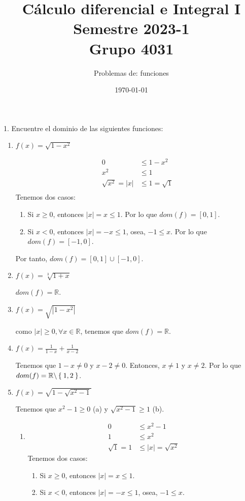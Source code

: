 \documentclass[11pt]{article}
\newcommand{\R}{\mathbb{R}}
\let\set\Set
\begin{document}
\title{\vspace{-2cm}Cálculo diferencial e Integral I \\ Semestre 2023-1 \\ Grupo 4031}
\author{Problemas de: funciones \\ }
\date{\today}
\maketitle
\thispagestyle{empty}

1. Encuentre el dominio de las siguientes funciones: \begin{enumerate}[label=\roman*)]
 \item $f(x)=\sqrt{1-x^2}$
 
 \begin{align*}
  0 &\leq 1-x^2 \\
  x^2 &\leq 1\\
  \sqrt{x^2} = |x| &\leq 1= \sqrt{1}\\
 \end{align*} Tenemos dos casos: \begin{enumerate}[label=\alph*)]
  \item Si $x\geq 0$, entonces $|x|=x\leq 1$. Por lo que $dom(f)=[0, 1]$.
  \item Si $x<0$, entonces $|x|=-x \leq 1$, osea, $-1\leq x$. Por lo que $dom(f)=[-1,0]$.
 \end{enumerate} Por tanto, $dom(f)=[0, 1]\cup[-1, 0]$.

 \item $f(x)=\sqrt[3]{1+x}$
 
 $dom(f)=\R$.

 \item $f(x)=\sqrt{|1-x^2|}$
 
 como $|x|\geq 0, \forall x\in \R$, tenemos que $dom(f)=\R$.

 \item $f(x)=\frac{1}{1-x}+\frac{1}{x-2}$
 
 Tenemos que $1-x\neq 0 $ y $x-2\neq 0$. Entonces, $x\neq 1$ y $x\neq 2$. Por lo que $dom(f)=\R\backslash \set{1,2}$.

 \item $f(x)=\sqrt{1-\sqrt{x^2-1}}$
 
 Tenemos que $x^2-1\geq 0$ (a) y $\sqrt{x^2-1} \geq 1$ (b). \begin{enumerate}[label=\arabic*)]
  \item \begin{align*}
   0 &\leq x^2-1\\
   1 &\leq x^2\\
   \sqrt{1} = 1 &\leq |x|=\sqrt{x^2}
  \end{align*} Tenemos dos casos: \begin{enumerate}[label=\alph*)]
   \item Si $x\geq 0$, entonces $|x|=x\leq 1$. 
   \item Si $x<0$, entonces $|x|=-x \leq 1$, osea, $-1\leq x$.
  \end{enumerate}


\end{enumerate}
\end{enumerate}
\end{document}
